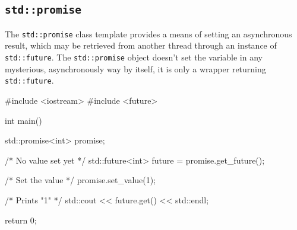 \documentclass[../main]{subfiles}
\begin{document}
\subsection{\texttt{std::promise}}
    The \texttt{std::promise} class template provides a means of setting an asynchronous result, which may be retrieved from another thread
through an instance of \texttt{std::future}. The \texttt{std::promise} object doesn't set the variable in any mysterious,
asynchronously way by itself, it is only a wrapper returning \texttt{std::future}.
\begin{Code}
    #include <iostream>
    #include <future>

    int main()
    {
        std::promise<int> promise;

        /* No value set yet */
        std::future<int> future = promise.get_future();

        /* Set the value */
        promise.set_value(1);

        /* Prints "1" */
        std::cout << future.get() << std::endl;

        return 0;
    }
\end{Code}
\end{document}
